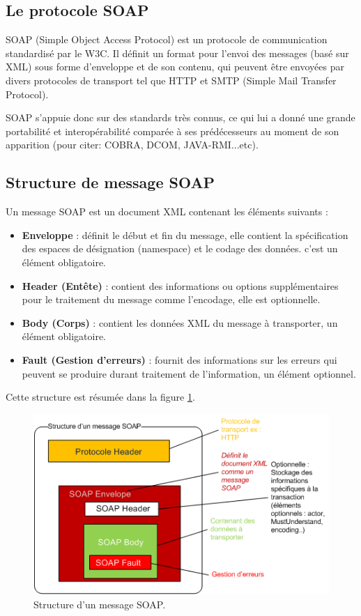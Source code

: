 \subsection{Le protocole SOAP}
SOAP (Simple Object Access Protocol) est un protocole de communication standardisé par le W3C. 
Il définit un format pour l'envoi des messages (basé sur XML) sous forme d'enveloppe et de son contenu, qui peuvent être envoyées par divers protocoles de transport tel que HTTP et SMTP (Simple Mail Transfer Protocol).
				
SOAP s'appuie donc sur des standards très connus, ce qui lui a donné une grande portabilité et interopérabilité comparée à ses prédécesseurs au moment de son apparition (pour citer: COBRA, DCOM, JAVA-RMI...etc).
				
\subsection{Structure de message SOAP}
Un message SOAP est un document XML contenant les éléments suivants \cite{refTutorialPointsSOAP} : 
\begin{itemize}
	\item \textbf{Enveloppe} : définit le début et fin du message, elle contient la spécification des espaces de désignation (namespace) et le codage des données. c'est un élément obligatoire.
	\item \textbf{Header (Entête)} : contient des informations ou options supplémentaires pour le traitement du message comme l'encodage, elle est optionnelle.
	\item \textbf{Body (Corps)} : contient les données XML du message à transporter, un élément obligatoire.
	\item \textbf{Fault (Gestion d'erreurs)} : fournit des informations sur les erreurs qui peuvent se produire durant traitement de l'information, un élément optionnel.
\end{itemize}
Cette structure est résumée dans la figure \ref{fig:structureSOAP}.

\begin{figure}[h]
	\begin{center}
		\includegraphics[scale=1]{img/soapmessagebody.png}
	\end{center}	
	\caption{Structure d'un message SOAP.}
	\label{fig:structureSOAP}
	\centering
\end{figure}

